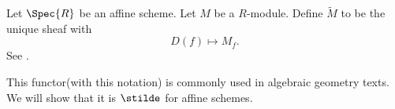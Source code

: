 \begin{definition}
Let $\Spec{R}$ be an affine scheme.
Let $M$ be a $R$-module.
Define $\widetilde{M}$ to be the unique sheaf with
\[
D(f) \mapsto M_f.
\]
See \cite[Tag 01HR]{stacks-project}.
\end{definition}

This functor(with this notation) is commonly used in algebraic geometry texts.
We will show that it is $\stilde$ for affine schemes.



